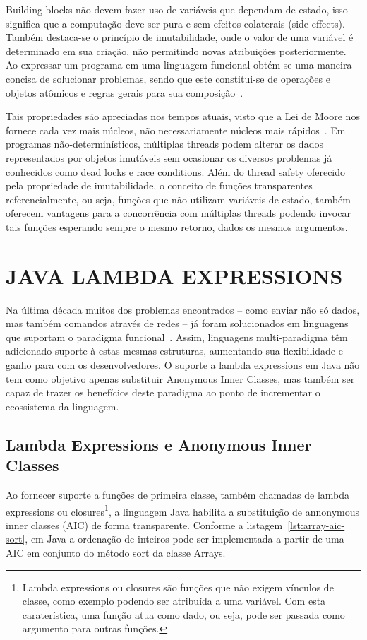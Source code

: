 \documentclass[10pt, conference]{IEEEtran}
\begin{document}
Building blocks não devem fazer uso de variáveis que dependam de estado, isso significa que a computação deve ser pura e sem efeitos colaterais (side-effects). Também destaca-se o princípio de imutabilidade, onde o valor de uma variável é determinado em sua criação, não permitindo novas atribuições posteriormente. Ao expressar um programa em uma linguagem funcional obtém-se uma maneira concisa de solucionar problemas, sendo que este constitui-se de operações e objetos atômicos e regras gerais para sua composição~\cite{michaelson2011introduction}.

Tais propriedades são apreciadas nos tempos atuais, visto que a Lei de Moore nos fornece cada vez mais núcleos, não necessariamente núcleos mais rápidos~\cite{jsr335}. Em programas não-determinísticos, múltiplas threads podem alterar os dados representados por objetos imutáveis sem ocasionar os diversos problemas já conhecidos como dead locks e race conditions. Além do thread safety oferecido pela propriedade de imutabilidade, o conceito de funções transparentes referencialmente, ou seja, funções que não utilizam variáveis de estado, também oferecem vantagens para a concorrência com múltiplas threads podendo invocar tais funções esperando sempre o mesmo retorno, dados os mesmos argumentos.

\section{JAVA LAMBDA EXPRESSIONS}

Na última década muitos dos problemas encontrados -- como enviar não só dados, mas também comandos através de redes -- já foram solucionados em linguagens que suportam o paradigma funcional~\cite{fischer2015java}. Assim, linguagens multi-paradigma têm adicionado suporte à estas mesmas estruturas, aumentando sua flexibilidade e ganho para com os desenvolvedores. O suporte a lambda expressions em Java não tem como objetivo apenas substituir Anonymous Inner Classes, mas também ser capaz de trazer os benefícios deste paradigma ao ponto de incrementar o ecossistema da linguagem.

\subsection{Lambda Expressions e Anonymous Inner Classes}
Ao fornecer suporte a funções de primeira classe, também chamadas de lambda expressions ou closures\footnote{Lambda expressions ou closures são funções que não exigem vínculos de classe, como exemplo podendo ser atribuída a uma variável. Com esta caraterística, uma função atua como dado, ou seja, pode ser passada como argumento para outras funções.}, a linguagem Java habilita a substituição de annonymous inner classes (AIC) de forma transparente. Conforme a listagem~\ref{lst:array-aic-sort}, em Java a ordenação de inteiros pode ser implementada a partir de uma AIC em conjunto do método sort da classe Arrays.
\end{document}
